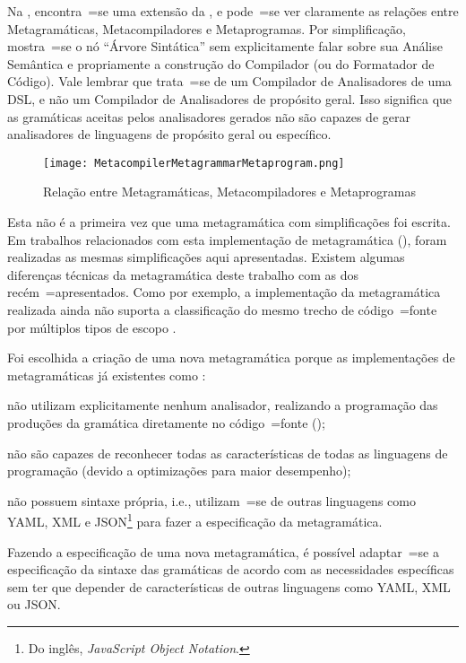 Na ,
encontra~=se uma extensão da ,
e pode~=se ver claramente as relações entre Metagramáticas,
Metacompiladores e Metaprogramas. Por simplificação,
mostra~=se o nó ``Árvore Sintática'' sem explicitamente falar sobre sua Análise Semântica e
propriamente a construção do Compilador (ou do Formatador de Código).
Vale lembrar que trata~=se de um Compilador de Analisadores de uma DSL,
e não um Compilador de Analisadores de propósito geral.
Isso significa que as gramáticas aceitas pelos analisadores gerados não são capazes de gerar analisadores de linguagens de propósito geral ou
específico.
\begin{figure}[!htb]
\caption{Relação entre Metagramáticas, Metacompiladores e Metaprogramas}
\label{figure:MetacompilerMetagrammarMetaprogram}
\centering
\texttt{[image: MetacompilerMetagrammarMetaprogram.png]}
\end{figure}

Esta não é a primeira vez que uma metagramática com simplificações foi escrita.
Em trabalhos relacionados com esta implementação de metagramática (),
foram realizadas as mesmas simplificações aqui apresentadas.
Existem algumas diferenças técnicas da metagramática deste trabalho com as dos recém~=apresentados.
Como por exemplo,
a implementação da metagramática realizada ainda não suporta a classificação do mesmo trecho de código~=fonte por múltiplos tipos de escopo \cite{vsCodeSyntaxHighlighthing}.

Foi escolhida a criação de uma nova metagramática porque as implementações de metagramáticas já existentes como :
\begin{inparaenum}[1)]
\item não utilizam explicitamente nenhum analisador,
realizando a programação das produções da gramática diretamente no código~=fonte ();
\item não são capazes de reconhecer todas as características de todas as linguagens de programação (devido a optimizações para maior desempenho);
\item não possuem sintaxe própria,
i.e.,
utilizam~=se de outras linguagens como YAML,
XML e JSON\footnote{%
Do inglês,
\textit{JavaScript Object Notation}.
} \cite{foundationsOfJSONSchema} para fazer a especificação da metagramática.
\end{inparaenum}%
Fazendo a especificação de uma nova metagramática,
é possível adaptar~=se a especificação da sintaxe das gramáticas de acordo com as necessidades específicas sem ter que depender de características de outras linguagens como YAML,
XML ou
JSON.

